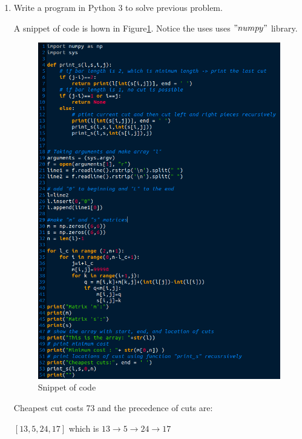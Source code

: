 \documentclass[11pt]{article}
\begin{document}
\begin{enumerate}
\begin{codebox}
	\end{codebox}

\pagebreak

	
\item Write a program in Python 3 to solve previous problem. 

	A snippet of code is hown in Figure\ref{fig:python_code}. Notice the uses uses $"numpy"$ library.
	
	\begin{figure}[h!]
		\centerline{\includegraphics[width=5.5in]{python_code.png}}
		\caption{Snippet of code}
		\label{fig:python_code}
	\end{figure}

	\pagebreak
	

	Cheapest cut costs 73 and the precedence of cuts are:
	
	$[13, 5, 24, 17] $ which is $13 \rightarrow 5 \rightarrow 24 \rightarrow 17 $
	


\end{enumerate}
\end{document}
